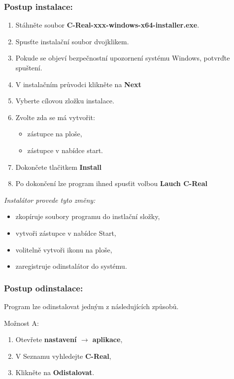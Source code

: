 \documentclass[12pt]{article}
\begin{document}
\subsubsection{Postup instalace:}
\begin{enumerate}
    \item Stáhněte soubor \textbf{C-Real-xxx-windows-x64-installer.exe}.
    \item Spusťte instalační soubor dvojklikem.
    \item Pokude se objeví bezpečnostní upozornení systému Windows, potvrďte spuštení.
    \item V instalačním průvodci klikněte na \textbf{Next}
    \item Vyberte cílovou zložku instalace.
    \item Zvolte zda se má vytvořit:
    \begin{itemize}
        \item zástupce na ploše,
        \item zástupce v nabídce start.
    \end{itemize}
    \item Dokončete tlačitkem \textbf{Install}
    \item Po dokončení lze program ihned spusťit volbou \textbf{Lauch C-Real}
\end{enumerate}

\emph{Instalátor provede tyto změny:}
\begin{itemize}
    \item zkopíruje soubory programu do instlační složky,
    \item vytvoři zástupce v nabídce Start,
    \item volitelně vytvoři ikonu na ploše,
    \item zaregistruje odinstalátor do systému.
\end{itemize}

\subsubsection{Postup odinstalace:}
Program lze odinstalovat jedným z následujících způsobů.\newline

\noindent Možnost A:
\begin{enumerate}
    \item Otevřete \textbf{nastavení $\rightarrow$ aplikace},
    \item V Seznamu vyhledejte \textbf{C-Real},
    \item Klikněte na \textbf{Odistalovat}.
\end{enumerate}
\end{document}
